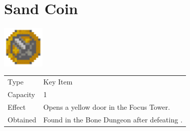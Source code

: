 \section{Sand Coin}
\label{item:sand_coin}

\includegraphics[height=2cm,keepaspectratio]{./resources/items/sandcoin}

\begin{longtable}{ l p{9cm} }
	Type
	& Key Item
\\ %
	Capacity
	& 1
\\ %
	Effect
	& Opens a yellow door in the Focus Tower.
\\ %
	Obtained
	& Found in the Bone Dungeon after defeating \nameref{monster:flamerus_rex}.
\end{longtable}
